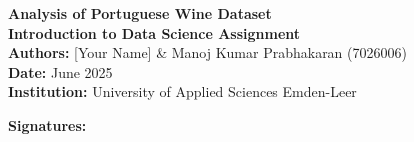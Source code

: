 \begin{titlepage}
\centering
\vspace*{2cm}

{\Huge \textbf{Analysis of Portuguese Wine Dataset}}\\[0.5cm]
{\Large \textbf{Introduction to Data Science Assignment}}\\[2cm]

{\large
\textbf{Authors:} [Your Name] \& Manoj Kumar Prabhakaran (7026006)\\[0.5cm]
\textbf{Date:} June 2025\\[0.5cm]
\textbf{Institution:} University of Applied Sciences Emden-Leer
}

\vfill

{\large \textbf{Signatures:} \underline{\hspace{4cm}} \underline{\hspace{4cm}}}

\end{titlepage}
\clearpage